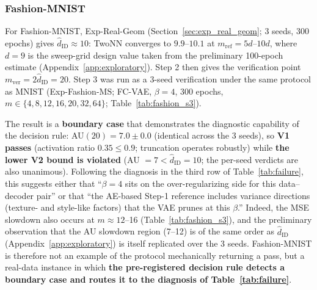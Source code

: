 \documentclass[make,article,submit,pdftex,moreauthors]{Definitions/mdpi}
\newcommand{\hatdID}{\hat{d}_{\mathrm{ID}}}
\begin{document}
\subsubsection{Fashion-MNIST}\label{sec:exp_fashion}

For Fashion-MNIST, Exp-Real-Geom (Section~\ref{sec:exp_real_geom}; 3 seeds,
300 epochs) gives $\hatdID \approx 10$: TwoNN converges to $9.9$--$10.1$
at $m_{\mathrm{ref}} = 5d$--$10d$, where $d = 9$ is the sweep-grid design
value taken from the preliminary 100-epoch estimate
(Appendix~\ref{app:exploratory}).
Step 2 then gives the verification point $m_{\mathrm{ver}} = 2\hatdID = 20$.
Step 3 was run as a 3-seed verification under the same protocol as MNIST
(Exp-Fashion-MS; FC-VAE, $\beta = 4$, 300 epochs,
$m \in \{4, 8, 12, 16, 20, 32, 64\}$; Table~\ref{tab:fashion_s3}).

The result is a \textbf{boundary case} that demonstrates the diagnostic
capability of the decision rule:
AU$(20) = 7.0 \pm 0.0$ (identical across the 3 seeds), so
\textbf{V1 passes} (activation ratio $0.35 \leq 0.9$; truncation operates
robustly) while \textbf{the lower V2 bound is violated}
(AU $= 7 < \hatdID = 10$; the per-seed verdicts are also unanimous).
Following the diagnosis in the third row of Table~\ref{tab:failure}, this
suggests either that ``$\beta = 4$ sits on the over-regularizing side for
this data--decoder pair'' or that ``the AE-based Step-1 reference includes
variance directions (texture- and style-like factors) that the VAE prunes
at this $\beta$.''
Indeed, the MSE slowdown also occurs at $m \approx 12$--16
(Table~\ref{tab:fashion_s3}), and the preliminary observation that the AU
slowdown region (7--12) is of the same order as $\hatdID$
(Appendix~\ref{app:exploratory}) is itself replicated over the 3 seeds.
Fashion-MNIST is therefore not an example of the protocol mechanically
returning a pass, but a real-data instance in which \textbf{the
pre-registered decision rule detects a boundary case and routes it to the
diagnosis of Table~\ref{tab:failure}}.
\end{document}
